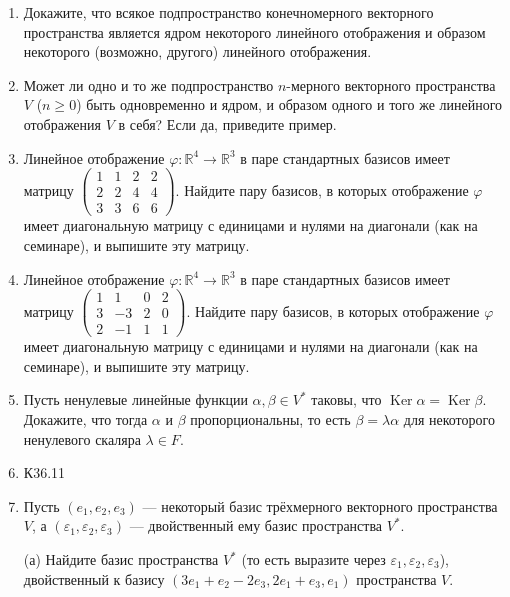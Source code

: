 \documentclass[10pt, a4paper]{extarticle}
\renewcommand{\ge}{\geqslant}
\def \R{\mathbb{R}}
\newcommand{\Ker}{\mathop{\mathrm{Ker}}}
\theoremstyle{definition}
\begin{document}
\begin{enumerate}

    \item Докажите, что всякое подпространство конечномерного векторного пространства является ядром некоторого линейного отображения и образом некоторого (возможно, другого) линейного отображения.

    \item Может ли одно и то же подпространство $n$-мерного векторного пространства $V$ ($n \ge 0$) быть одновременно и ядром, и образом одного и того же линейного отображения $V$ в себя? Если да, приведите пример.

    \item
    Линейное отображение $\varphi \colon \R^4 \to \R^3$ в паре стандартных базисов имеет матрицу $\begin{pmatrix} 1 & 1 & 2 & 2 \\ 2 & 2 & 4 & 4 \\ 3 & 3 & 6 & 6 \end{pmatrix}$.
    Найдите пару базисов, в которых отображение $\varphi$ имеет диагональную матрицу с единицами и нулями на диагонали (как на семинаре), и выпишите эту матрицу.

    \item
    Линейное отображение $\varphi \colon \R^4 \to \R^3$ в паре стандартных базисов имеет матрицу $\begin{pmatrix} 1 & 1 & 0 & 2 \\ 3 & -3 & 2 & 0 \\ 2 & -1 & 1 & 1 \end{pmatrix}$.
    Найдите пару базисов, в которых отображение $\varphi$ имеет диагональную матрицу с единицами и нулями на диагонали (как на семинаре), и выпишите эту матрицу.

    \item
    Пусть ненулевые линейные функции $\alpha, \beta \in V^*$ таковы, что $\Ker \alpha = \Ker \beta$. Докажите, что тогда $\alpha$ и $\beta$ пропорциональны, то есть $\beta = \lambda \alpha$ для некоторого ненулевого скаляра $\lambda \in F$.

    \item
    К36.11


    \item
    Пусть $(e_1,e_2,e_3)$ --- некоторый базис трёхмерного векторного пространства $V$, а $(\varepsilon_1, \varepsilon_2, \varepsilon_3)$ --- двойственный ему базис пространства $V^*$.

    (а) Найдите базис пространства $V^*$ (то есть выразите через $\varepsilon_1,\varepsilon_2,\varepsilon_3$), двойственный к базису $(3e_1+e_2-2e_3, 2e_1+e_3,e_1)$ пространства $V$.


\end{enumerate}
\end{document}
